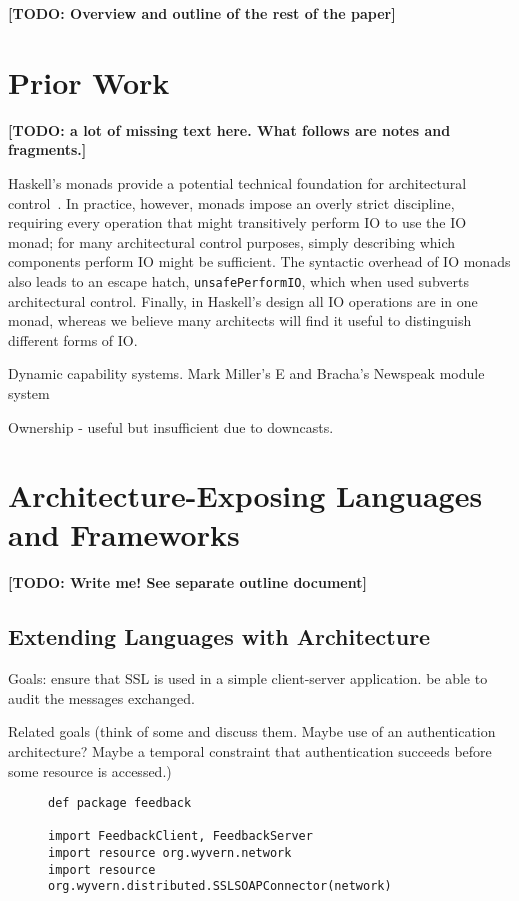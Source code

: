 \documentclass[runningheads]{llncs}
\newcommand{\TODO}[1]{\textbf{[TODO: #1]}}
\begin{document}
\begin{sloppypar}
\TODO{Overview and outline of the rest of the paper}


\section{Prior Work}

\TODO{a lot of missing text here.  What follows are notes and fragments.}

Haskell's monads provide a potential technical foundation for architectural control~\cite{Haskell-monads}.  In practice, however, monads impose an overly strict discipline, requiring every operation that might transitively perform IO to use the IO monad; for many architectural control purposes, simply describing which components perform IO might be sufficient.  The syntactic overhead of IO monads also leads to an escape hatch, \texttt{unsafePerformIO}, which when used subverts architectural control.  Finally, in Haskell's design all IO operations are in one monad, whereas we believe many architects will find it useful to distinguish different forms of IO.

Dynamic capability systems.  Mark Miller's E and Bracha's Newspeak module system

Ownership - useful but insufficient due to downcasts.

\section{Architecture-Exposing Languages and Frameworks}

\TODO{Write me!  See separate outline document}

\subsection{Extending Languages with Architecture}

Goals: ensure that SSL is used in a simple client-server application.  be able to audit the messages exchanged.

Related goals (think of some and discuss them.  Maybe use of an authentication architecture?  Maybe a temporal constraint that authentication succeeds before some resource is accessed.)

   
\begin{figure}[t]
\begin{lstlisting}
def package feedback

import FeedbackClient, FeedbackServer
import resource org.wyvern.network
import resource org.wyvern.distributed.SSLSOAPConnector(network)


\end{lstlisting}
\end{figure}
\end{sloppypar}
\end{document}
